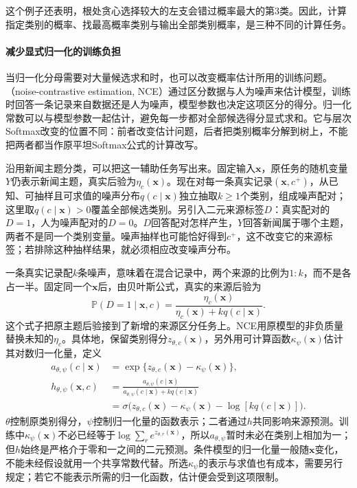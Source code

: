 这个例子还表明，根处贪心选择较大的左支会错过概率最大的第3类。因此，计算指定类别的概率、找最高概率类别与输出全部类别概率，是三种不同的计算任务。

\paragraph{减少显式归一化的训练负担}
\label{sec:classification-softmax-noise-contrast}

当归一化分母需要对大量候选求和时，也可以改变概率估计所用的训练问题。（noise-contrastive estimation, NCE）通过区分数据与人为噪声来估计模型，训练时回答一条记录来自数据还是人为噪声，模型参数也决定这项区分的得分。归一化常数可以与模型参数一起估计，避免每一步都对全部候选得分显式求和。它与层次Softmax改变的位置不同：前者改变估计问题，后者把类别概率分解到树上，不能把两者都当作原平坦Softmax公式的计算改写。

沿用新闻主题分类，可以把这一辅助任务写出来。固定输入$\bm x$，原任务的随机变量$Y$仍表示新闻主题，真实后验为$\eta_c(\bm x)$。现在对每一条真实记录$(\bm x,c^+)$，从已知、可抽样且可求值的噪声分布$q(c\mid\bm x)$独立抽取$k\geq1$个类别，组成噪声配对；这里取$q(c\mid\bm x)>0$覆盖全部候选类别。另引入二元来源标签$D$：真实配对的$D=1$，人为噪声配对的$D=0$。$D$回答配对怎样产生，$Y$回答新闻属于哪个主题，两者不是同一个类别变量。噪声抽样也可能恰好得到$c^+$，这不改变它的来源标签；若排除这种抽样结果，就必须相应改变噪声分布。

一条真实记录配$k$条噪声，意味着在混合记录中，两个来源的比例为$1:k$，而不是各占一半。固定同一个$\bm x$后，由贝叶斯公式，真实的来源后验为
\[
  \mathbb P(D=1\mid\bm x,c)
  =\frac{\eta_c(\bm x)}
    {\eta_c(\bm x)+kq(c\mid\bm x)}.
\]
这个式子把原主题后验接到了新增的来源区分任务上。NCE用原模型的非负质量替换未知的$\eta_c$。具体地，保留类别得分$z_{\theta,c}(\bm x)$，另外用可计算函数$\kappa_{\psi}(\bm x)$估计其对数归一化量，定义
\begin{equation}
  \label{eq:classification-nce-source-model}
  \begin{aligned}
    a_{\theta,\psi}(c\mid\bm x)
      &=\exp\{z_{\theta,c}(\bm x)-\kappa_{\psi}(\bm x)\},\\
    h_{\theta,\psi}(\bm x,c)
      &=\frac{a_{\theta,\psi}(c\mid\bm x)}
        {a_{\theta,\psi}(c\mid\bm x)+kq(c\mid\bm x)}\\
      &=\sigma\bigl(z_{\theta,c}(\bm x)-\kappa_{\psi}(\bm x)
                  -\log[kq(c\mid\bm x)]\bigr).
  \end{aligned}
\end{equation}
$\theta$控制原类别得分，$\psi$控制归一化量的函数表示；二者通过$h$共同影响来源预测。训练中$\kappa_{\psi}(\bm x)$不必已经等于$\log\sum_r e^{z_{\theta,r}(\bm x)}$，所以$a_{\theta,\psi}$暂时未必在类别上相加为一；但$h$始终是严格介于零和一之间的二元预测。条件模型的归一化量一般随$\bm x$变化，不能未经假设就用一个共享常数代替。所选$\kappa_{\psi}$的表示与求值也有成本，需要另行规定；若它不能表示所需的归一化函数，估计便会受到这项限制。

